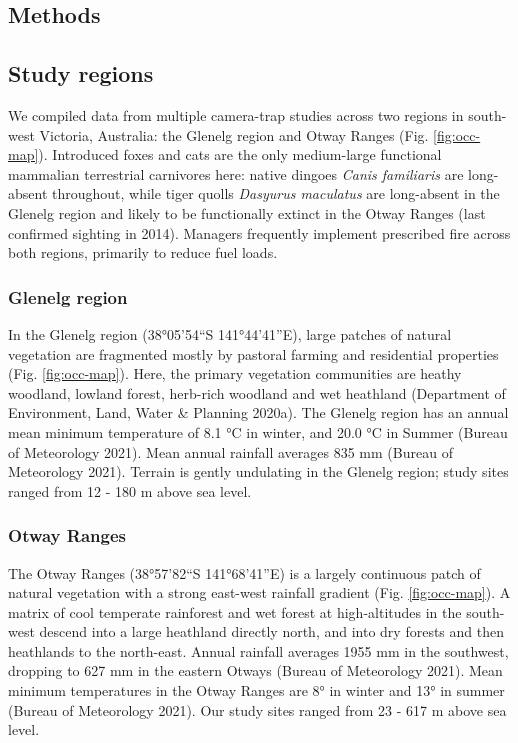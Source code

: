 \documentclass[11pt,a4paper,titlepage,twoside,openright]{style/unimelbthesis}
\begin{document}
\begin{mainmatter}
\newpage

\hypertarget{methods-1}{%
\section{Methods}\label{methods-1}}

\hypertarget{study-regions}{%
\subsection{Study regions}\label{study-regions}}

We compiled data from multiple camera-trap studies across two regions in south-west Victoria, Australia: the Glenelg region and Otway Ranges (Fig. \ref{fig:occ-map}). Introduced foxes and cats are the only medium-large functional mammalian terrestrial carnivores here: native dingoes \emph{Canis familiaris} are long-absent throughout, while tiger quolls \emph{Dasyurus maculatus} are long-absent in the Glenelg region and likely to be functionally extinct in the Otway Ranges (last confirmed sighting in 2014). Managers frequently implement prescribed fire across both regions, primarily to reduce fuel loads.

\hypertarget{glenelg-region}{%
\subsubsection{Glenelg region}\label{glenelg-region}}

In the Glenelg region (38°05'54``S 141°44'41''E), large patches of natural vegetation are fragmented mostly by pastoral farming and residential properties (Fig. \ref{fig:occ-map}). Here, the primary vegetation communities are heathy woodland, lowland forest, herb-rich woodland and wet heathland (Department of Environment, Land, Water \& Planning 2020a). The Glenelg region has an annual mean minimum temperature of 8.1 °C in winter, and 20.0 °C in Summer (Bureau of Meteorology 2021). Mean annual rainfall averages 835 mm (Bureau of Meteorology 2021). Terrain is gently undulating in the Glenelg region; study sites ranged from 12 - 180 m above sea level.

\hypertarget{otway-ranges}{%
\subsubsection{Otway Ranges}\label{otway-ranges}}

The Otway Ranges (38°57'82``S 141°68'41''E) is a largely continuous patch of natural vegetation with a strong east-west rainfall gradient (Fig. \ref{fig:occ-map}). A matrix of cool temperate rainforest and wet forest at high-altitudes in the south-west descend into a large heathland directly north, and into dry forests and then heathlands to the north-east. Annual rainfall averages 1955 mm in the southwest, dropping to 627 mm in the eastern Otways (Bureau of Meteorology 2021). Mean minimum temperatures in the Otway Ranges are 8° in winter and 13° in summer (Bureau of Meteorology 2021). Our study sites ranged from 23 - 617 m above sea level.


\end{mainmatter}
\end{document}
